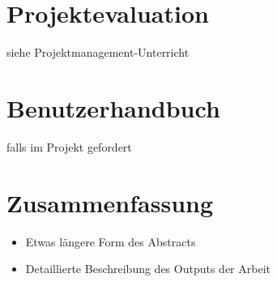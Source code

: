 \chapter{Projektevaluation}
siehe Projektmanagement-Unterricht

\chapter{Benutzerhandbuch} 
falls im Projekt gefordert

\chapter{Zusammenfassung}
\begin{itemize}
	\item Etwas längere Form des Abstracts
	\item Detaillierte Beschreibung des Outputs der Arbeit
\end{itemize}